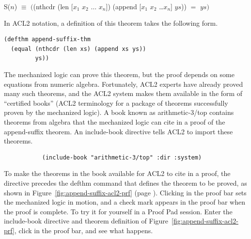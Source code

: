 \begin{samepage}
\begin{center}
S($n$) $\equiv$ $($\textsf{(nthcdr (len [$x_1$ $x_2$ $\dots$ $x_n$]) (append [$x_1$ $x_2$ \dots $x_n$] $ys$))}
$=$ $ys)$
\end{center}
\end{samepage}

In ACL2 notation, a definition of this theorem takes the following form.

\begin{code}
\begin{verbatim}
(defthm append-suffix-thm
  (equal (nthcdr (len xs) (append xs ys))
         ys))
\end{verbatim}
\end{code}

The mechanized logic can prove this theorem, but
the proof depends on some equations from numeric algebra.
Fortunately, ACL2 experts have already proved many such theorems,
and the ACL2 system makes them available in the form of
``certified books''
(ACL2 terminology for a package of theorems successfully proven by the
mechanized logic).
A book known as
\label{arith-top-book}\textsf{arithmetic-3/top}
contains theorems from algebra
that the mechanized logic can cite in
a proof of the append-suffix theorem.
An \textsf{include-book} directive tells ACL2 to
import
these theorems.
\begin{code}
\begin{verbatim}
           (include-book "arithmetic-3/top" :dir :system)
\end{verbatim}
\end{code}

To make the theorems in the book available
for ACL2 to cite in a proof,
the directive precedes the \textsf{defthm} command that
defines the theorem to be proved, as shown in
Figure~\ref{fig:append-suffix-acl2-prf} (page \pageref{fig:append-suffix-acl2-prf}).
Clicking in the proof bar sets the mechanized logic in motion,
and a check mark appears in the proof bar when
the proof is complete.
To try it for yourself in a Proof Pad session.
Enter the include-book directive
and theorem definition of Figure~\ref{fig:append-suffix-acl2-prf},
click in the proof bar, and see what happens.

